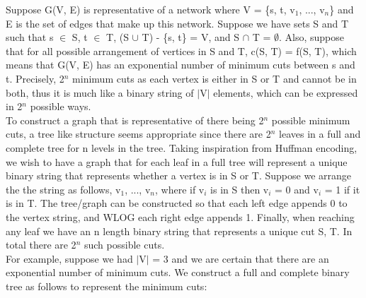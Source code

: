 \documentclass[10pt]{csc_assignment}
\begin{document}
\begin{description}

\newpage
\item[Q1.]

Suppose G(V, E) is representative of a network where V = \{s, t, v$_{1}$, ..., v$_{n}$\} 
and E is the set of edges that make up this network. Suppose we have sets S and T such that
s $\in$ S, t $\in$ T, (S $\cup$ T) - \{s, t\} = V, and S $\cap$ T = $\emptyset$. Also, 
suppose that for all possible arrangement of vertices in S and T, c(S, T) = f(S, T), which means that G(V, E) has an exponential number of minimum cuts between s and t. Precisely, 2$^{n}$ minimum cuts as each vertex is either in S or T and cannot be in both, thus it is much like a binary string of $\mid$V$\mid$ elements, which can be expressed in 2$^{n}$ possible ways.\\

To construct a graph that is representative of there being 2$^{n}$ possible minimum cuts, a tree
like structure seems appropriate since there are 2$^{n}$ leaves in a full and complete tree for n levels in the tree. Taking inspiration from Huffman encoding, we wish to have a graph that for each leaf in a full tree will represent a unique binary string that represents whether a vertex is in S or T. Suppose we arrange the the string as follows, v$_{1}$, ..., v$_{n}$, where if v$_{i}$ is in S then v$_{i}$ = 0 and v$_{i}$ = 1 if it is in T. The tree/graph can be constructed so that each left edge appends 0 to the vertex string, and WLOG each right edge appends 1. Finally, when reaching any leaf we have an n length binary string that represents a unique cut S, T. In total there are 2$^{n}$ such possible cuts.\\ 

For example, suppose we had $\mid$V$\mid$ = 3 and we are certain that there are an exponential number of minimum cuts. We construct a full and complete binary tree as follows to represent the minimum cuts:\\


\end{description}
\end{document}
